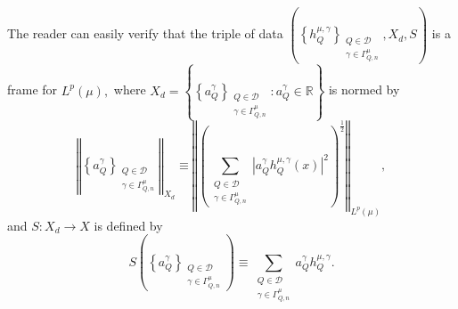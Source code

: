 \documentclass{amsart}%
\theoremstyle{plain}
\numberwithin{equation}{section}
\begin{document}
The reader can easily verify that the triple of data $\left(  \left\{
h_{Q}^{\mu,\gamma}\right\}  _{\substack{Q\in\mathcal{D}\\\gamma\in\Gamma
_{Q,n}^{\mu}}},X_{d},S\right)  $ is a frame for $L^{p}\left(  \mu\right)  ,$
where $X_{d}=\left\{  \left\{  a_{Q}^{\gamma}\right\}  _{\substack{Q\in
\mathcal{D}\\\gamma\in\Gamma_{Q,n}^{\mu}}}:a_{Q}^{\gamma}\in\mathbb{R}%
\right\}  $ is normed by%
\[
\left\Vert \left\{  a_{Q}^{\gamma}\right\}  _{\substack{Q\in\mathcal{D}%
\\\gamma\in\Gamma_{Q,n}^{\mu}}}\right\Vert _{X_{d}}\equiv\left\Vert \left(
\sum_{\substack{Q\in\mathcal{D}\\\gamma\in\Gamma_{Q,n}^{\mu}}}\left\vert
a_{Q}^{\gamma}h_{Q}^{\mu,\gamma}\left(  x\right)  \right\vert ^{2}\right)
^{\frac{1}{2}}\right\Vert _{L^{p}\left(  \mu\right)  },
\]
and $S:X_{d}\rightarrow X$ is defined by%
\[
S\left(  \left\{  a_{Q}^{\gamma}\right\}  _{\substack{Q\in\mathcal{D}%
\\\gamma\in\Gamma_{Q,n}^{\mu}}}\right)  \equiv\sum_{\substack{Q\in
\mathcal{D}\\\gamma\in\Gamma_{Q,n}^{\mu}}}a_{Q}^{\gamma}h_{Q}^{\mu,\gamma}.
\]
\end{document}
